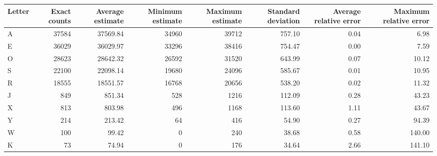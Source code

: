 \begin{tabular}{lrrrrrrr}
\toprule
Letter &  Exact counts &  Average estimate &  Minimum estimate &  Maximum estimate &  Standard deviation &  Average relative error &  Maximum relative error \\
\midrule
     A &         37584 &          37569.84 &             34960 &             39712 &              757.10 &                    0.04 &                    6.98 \\
     E &         36029 &          36029.97 &             33296 &             38416 &              754.47 &                    0.00 &                    7.59 \\
     O &         28623 &          28642.32 &             26592 &             31520 &              643.99 &                    0.07 &                   10.12 \\
     S &         22100 &          22098.14 &             19680 &             24096 &              585.67 &                    0.01 &                   10.95 \\
     R &         18555 &          18551.57 &             16768 &             20656 &              538.20 &                    0.02 &                   11.32 \\
     J &           849 &            851.34 &               528 &              1216 &              112.09 &                    0.28 &                   43.23 \\
     X &           813 &            803.98 &               496 &              1168 &              113.60 &                    1.11 &                   43.67 \\
     Y &           214 &            213.42 &                64 &               416 &               54.90 &                    0.27 &                   94.39 \\
     W &           100 &             99.42 &                 0 &               240 &               38.68 &                    0.58 &                  140.00 \\
     K &            73 &             74.94 &                 0 &               176 &               34.64 &                    2.66 &                  141.10 \\
\bottomrule
\end{tabular}
